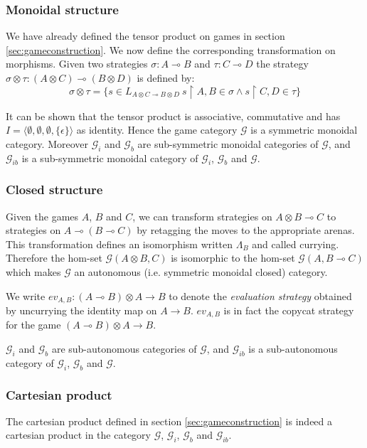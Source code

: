 \subsubsection{Monoidal structure}

We have already defined the tensor product on games in section
\ref{sec:gameconstruction}. We now define the corresponding
transformation on morphisms. Given two strategies $\sigma : A
\multimap B$ and $\tau : C \multimap D$ the strategy $\sigma \otimes
\tau : (A \otimes C) \multimap (B\otimes D)$ is defined by:
$$ \sigma \otimes \tau = \{ s \in L_{A \otimes C \multimap B\otimes D} \ s \upharpoonright A,B \in \sigma
\wedge s \upharpoonright C,D \in \tau \}$$

It can be shown that the tensor product is associative, commutative
and has $I = \langle \emptyset, \emptyset,\emptyset, \{ \epsilon \}
\rangle $ as identity. Hence the game category $\mathcal{G}$ is a
symmetric monoidal category. Moreover $\mathcal{G}_i$ and
$\mathcal{G}_b$ are sub-symmetric monoidal categories of
$\mathcal{G}$, and $\mathcal{G}_{ib}$ is a sub-symmetric monoidal
category of $\mathcal{G}_i$, $\mathcal{G}_b$ and $\mathcal{G}$.

\subsubsection{Closed structure}

Given the games $A$, $B$ and $C$, we can transform strategies on $A\otimes B \multimap C$ to
strategies on $A \multimap (B \multimap C)$ by retagging the moves to the appropriate arenas. This transformation
defines an isomorphism written $\Lambda_B$ and called currying. Therefore the hom-set $\mathcal{G}(A\otimes B, C)$ is isomorphic to the hom-set
$\mathcal{G}(A,B\multimap C)$ which makes $\mathcal{G}$ an autonomous (i.e. symmetric monoidal closed) category.

We write $ev_{A,B} : (A \multimap B) \otimes A \rightarrow B$ to denote the \emph{evaluation strategy} obtained by uncurrying the
identity map on $A \rightarrow B$. $ev_{A,B}$ is in fact the copycat strategy for the game
$(A \multimap B) \otimes A \rightarrow B$.

$\mathcal{G}_i$ and  $\mathcal{G}_b$ are sub-autonomous categories of $\mathcal{G}$,
and $\mathcal{G}_{ib}$ is a sub-autonomous category of $\mathcal{G}_i$, $\mathcal{G}_b$ and
$\mathcal{G}$.

\subsubsection{Cartesian product}
The cartesian product defined in section \ref{sec:gameconstruction} is indeed a cartesian product in the category
$\mathcal{G}$, $\mathcal{G}_i$, $\mathcal{G}_b$ and $\mathcal{G}_{ib}$.

